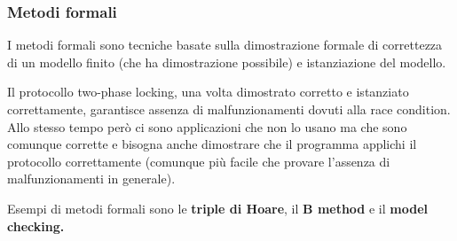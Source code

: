 \subsubsection{Metodi formali}
I metodi formali sono tecniche basate sulla dimostrazione formale di correttezza di un modello finito (che ha dimostrazione possibile) e istanziazione del modello.
\begin{example}
	Il protocollo two-phase locking, una volta dimostrato corretto e istanziato correttamente, garantisce assenza di malfunzionamenti dovuti alla race condition. Allo stesso tempo però ci sono applicazioni che non lo usano ma che sono comunque corrette e bisogna anche dimostrare che il programma applichi il protocollo correttamente (comunque più facile che provare l'assenza di malfunzionamenti in generale).
\end{example}
Esempi di metodi formali sono le \textbf{triple di Hoare}, il \textbf{B method} e il \textbf{model checking.}
\begin{figure}[!h]
	\hfill
	\hfill
\end{figure}